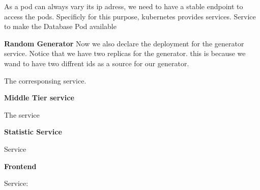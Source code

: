 As a pod can always vary its ip adress, we need to have a stable endpoint to access the pods.
Specificly for this purpose, kubernetes provides services.
Service to make the Database Pod available 


\textbf{Random Generator}
Now we also declare the deployment for the generator service.
Notice that we have two replicas for the generator. this is because we wand to have two diffrent ids as a source for our generator.


The corresponsing service.


\textbf{Middle Tier service}

The service


\textbf{Statistic Service}

Service


\textbf{Frontend}


Service:

